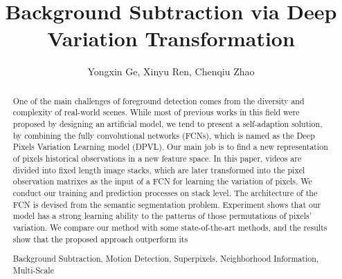 \documentclass[runningheads,a4paper]{llncs}
\newcommand{\keywords}[1]{\par\addvspace\baselineskip
\noindent\keywordname\enspace\ignorespaces#1}
\begin{document}
\mainmatter  %

\title{Background Subtraction via Deep Variation Transformation}


%
\author{Yongxin Ge, Xinyu Ren, Chenqiu Zhao}
%


%
%

\maketitle


\begin{abstract}
One of the main challenges of foreground detection comes from the diversity and complexity of real-world scenes. While most of previous works in this field were proposed by designing an artificial model, we tend to present a self-adaption solution, by combining the fully convolutional networks (FCNs), which is named as the Deep Pixels Variation Learning model (DPVL). Our main job is to find a new representation of pixels historical observations in a new feature space. In this paper, videos are divided into fixed length image stacks, which are later transformed into the pixel observation matrixes as the input of a FCN for learning the variation of pixels. We conduct our training and prediction processes on stack level. The architecture of the FCN is devised from the semantic segmentation problem. Experiment shows that our model has a strong learning ability to the patterns of those permutations of pixels’ variation. We compare our method with some state-of-the-art methods, and the results show that the proposed approach outperform its
\keywords{Background Subtraction, Motion Detection, Superpixels, Neighborhood Information, Multi-Scale}
\end{abstract}
\end{document}
